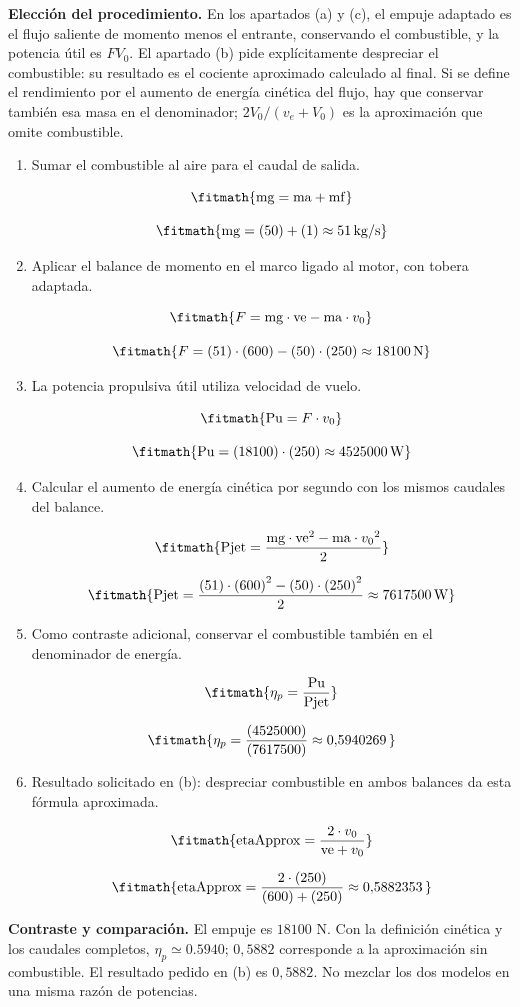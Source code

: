 \noindent\textbf{Elección del procedimiento.} En los apartados (a) y (c), el empuje adaptado es el flujo saliente de momento menos el entrante, conservando el combustible, y la potencia útil es $FV_0$. El apartado (b) pide explícitamente despreciar el combustible: su resultado es el cociente aproximado calculado al final. Si se define el rendimiento por el aumento de energía cinética del flujo, hay que conservar también esa masa en el denominador; $2V_0/(v_e+V_0)$ es la aproximación que omite combustible.

\begin{enumerate}

\item Sumar el combustible al aire para el caudal de salida.

\[\fitmath{\mathrm{mg}=\mathrm{ma}+\mathrm{mf}}\]

\[\fitmath{\mathrm{mg}=(50)+(1)\approx 51\,\mathrm{kg/s}}\]

\item Aplicar el balance de momento en el marco ligado al motor, con tobera adaptada.

\[\fitmath{F=\mathrm{mg}\cdot \mathrm{ve}-\mathrm{ma}\cdot v_{0}}\]

\[\fitmath{F=(51)\cdot (600)-(50)\cdot (250)\approx 18100\,\mathrm{N}}\]

\item La potencia propulsiva útil utiliza velocidad de vuelo.

\[\fitmath{\mathrm{Pu}=F\cdot v_{0}}\]

\[\fitmath{\mathrm{Pu}=(18100)\cdot (250)\approx 4525000\,\mathrm{W}}\]

\item Calcular el aumento de energía cinética por segundo con los mismos caudales del balance.

\[\fitmath{\mathrm{Pjet}=\frac{\mathrm{mg}\cdot {\mathrm{ve}}^{2}-\mathrm{ma}\cdot {v_{0}}^{2}}{2}}\]

\[\fitmath{\mathrm{Pjet}=\frac{(51)\cdot {(600)}^{2}-(50)\cdot {(250)}^{2}}{2}\approx 7617500\,\mathrm{W}}\]

\item Como contraste adicional, conservar el combustible también en el denominador de energía.

\[\fitmath{\eta_p=\frac{\mathrm{Pu}}{\mathrm{Pjet}}}\]

\[\fitmath{\eta_p=\frac{(4525000)}{(7617500)}\approx 0{,}5940269\,}\]

\item Resultado solicitado en (b): despreciar combustible en ambos balances da esta fórmula aproximada.

\[\fitmath{\mathrm{etaApprox}=\frac{2\cdot v_{0}}{\mathrm{ve}+v_{0}}}\]

\[\fitmath{\mathrm{etaApprox}=\frac{2\cdot (250)}{(600)+(250)}\approx 0{,}5882353\,}\]

\end{enumerate}

\noindent\textbf{Contraste y comparación.} El empuje es $18100$ N. Con la definición cinética y los caudales completos, $\eta_p\simeq0.5940$; $0{,}5882$ corresponde a la aproximación sin combustible. El resultado pedido en (b) es $0{,}5882$. No mezclar los dos modelos en una misma razón de potencias.

